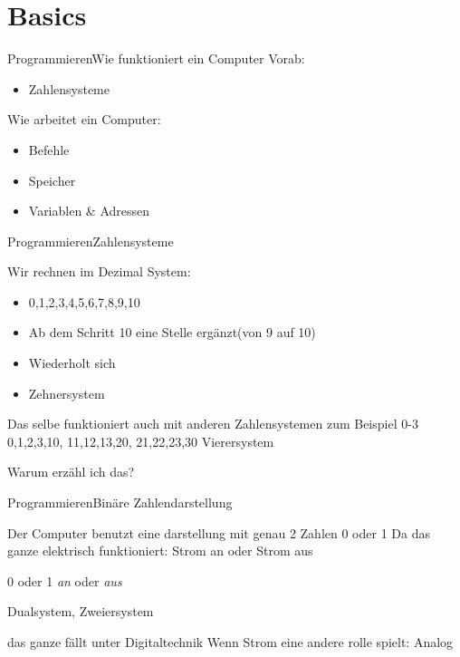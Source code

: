\section{Basics}


\begin{frame}{Programmieren}{Wie funktioniert ein Computer}
	Vorab:
	\begin{itemize}
	\item Zahlensysteme
	\end{itemize}	
	
	Wie arbeitet ein Computer:
	\begin{itemize}
	\item Befehle
	\item Speicher
	\item Variablen \& Adressen
	\end{itemize}
\end{frame}



\begin{frame}{Programmieren}{Zahlensysteme}

	Wir rechnen im Dezimal System:
	\begin{itemize}
	\item 0,1,2,3,4,5,6,7,8,9,10 
	\item Ab dem Schritt 10  eine Stelle ergänzt(von 9 auf 10) 
	\item Wiederholt sich
	\item Zehnersystem
	\end{itemize}
	
	
	Das selbe funktioniert auch mit anderen Zahlensystemen zum Beispiel 0-3 
	0,1,2,3,10,
	11,12,13,20,
	21,22,23,30
	Vierersystem
	
	Warum erzähl ich das?
	
\end{frame}

\begin{frame}{Programmieren}{Binäre Zahlendarstellung}

	Der Computer benutzt eine darstellung mit genau 2 Zahlen 0 oder 1 
	Da das ganze elektrisch funktioniert: Strom an oder Strom aus	
	
	0 oder 1
	\emph{an} oder \textit{aus}

	Dualsystem, Zweiersystem	
	
	das ganze fällt unter Digitaltechnik
	Wenn Strom eine andere rolle spielt: Analog
	
\end{frame}

